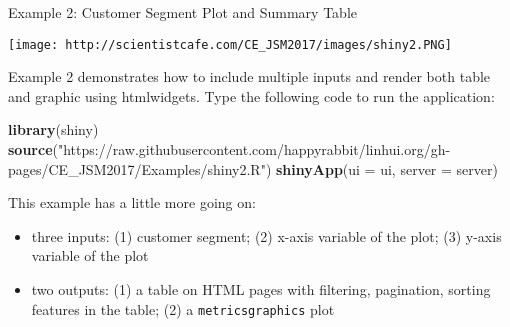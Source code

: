 \documentclass[
]{article}
\newenvironment{Shaded}{\begin{snugshade}}{\end{snugshade}}
\newcommand{\DataTypeTok}[1]{\textcolor[rgb]{0.13,0.29,0.53}{#1}}
\newcommand{\KeywordTok}[1]{\textcolor[rgb]{0.13,0.29,0.53}{\textbf{#1}}}
\newcommand{\NormalTok}[1]{#1}
\newcommand{\StringTok}[1]{\textcolor[rgb]{0.31,0.60,0.02}{#1}}
\providecommand{\tightlist}{%
  \setlength{\itemsep}{0pt}\setlength{\parskip}{0pt}}
\begin{document}
Example 2: Customer Segment Plot and Summary Table

\texttt{[image: http://scientistcafe.com/CE\_JSM2017/images/shiny2.PNG]}

Example 2 demonstrates how to include multiple inputs and render both
table and graphic using htmlwidgets. Type the following code to run the
application:

\begin{Shaded}
\begin{Highlighting}[]
\KeywordTok{library}\NormalTok{(shiny)}
\KeywordTok{source}\NormalTok{(}\StringTok{"https://raw.githubusercontent.com/happyrabbit/linhui.org/gh-pages/CE_JSM2017/Examples/shiny2.R"}\NormalTok{)}
\KeywordTok{shinyApp}\NormalTok{(}\DataTypeTok{ui =}\NormalTok{ ui, }\DataTypeTok{server =}\NormalTok{ server)}
\end{Highlighting}
\end{Shaded}

This example has a little more going on:

\begin{itemize}
\tightlist
\item
  three inputs: (1) customer segment; (2) x-axis variable of the plot;
  (3) y-axis variable of the plot
\item
  two outputs: (1) a table on HTML pages with filtering, pagination,
  sorting features in the table; (2) a \texttt{metricsgraphics} plot
\end{itemize}
\end{document}
